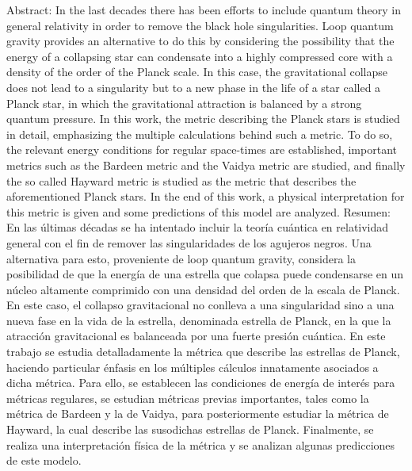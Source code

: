 \documentclass[16pt,a4paper]{article}
\numberwithin{equation}{section}
\theoremstyle{definition}
\begin{document}
\doublespacing
\newpage
\vspace*{\fill}
\noindent
\huge{Abstract:}
\newline\newline
\normalsize
In the last decades there has been efforts to include quantum theory in general relativity in order to remove the black hole singularities. Loop quantum gravity provides an alternative to do this by considering the possibility that the energy of a collapsing star can condensate into a highly compressed core with a density of the order of the Planck scale. In this case, the gravitational collapse does not lead to a singularity but to a new phase in the life of a star called a Planck star, in which the gravitational attraction is balanced by a strong quantum pressure. In this work, the metric describing the Planck stars is studied in detail, emphasizing the multiple calculations behind such a metric. To do so, the relevant energy conditions for regular space-times are established, important metrics such as the Bardeen metric and the Vaidya metric are studied, and finally the so called Hayward metric is studied as the metric that describes the aforementioned Planck stars. In the end of this work, a physical interpretation for this metric is given and some predictions of this model are analyzed.
\vspace*{1cm}
\newline\newline
\huge{Resumen:}
\newline\newline
\normalsize
En las últimas décadas se ha intentado incluir la teoría cuántica en relatividad general con el fin de remover las singularidades de los agujeros negros. Una alternativa para esto, proveniente de loop quantum gravity, considera la posibilidad de que la energía de una estrella que colapsa puede condensarse en un núcleo altamente comprimido con una densidad del orden de la escala de Planck. En este caso, el collapso gravitacional no conlleva a una singularidad sino a una nueva fase en la vida de la estrella, denominada estrella de Planck, en la que la atracción gravitacional es balanceada por una fuerte presión cuántica. En este trabajo se estudia detalladamente la métrica que describe las estrellas de Planck, haciendo particular énfasis en los múltiples cálculos innatamente asociados a dicha métrica. Para ello, se establecen las condiciones de energía de interés para métricas regulares, se estudian métricas previas importantes, tales como la métrica de Bardeen y la de Vaidya, para posteriormente estudiar la métrica de Hayward, la cual describe las susodichas estrellas de Planck. Finalmente, se realiza una interpretación física de la métrica y se analizan algunas predicciones de este modelo.
\vspace*{\fill}
\end{document}
